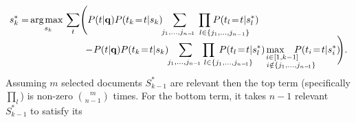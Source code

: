 \begin{align}
s_k^* =  & \, \argmax_{s_k} \sum_t \Biggl( P(t|\vec{q}) P(t_k\!=\!t|s_k)  \sum_{\hspace{-1mm} j_1, \dots, j_{n-\!1}} \hspace{-13.5mm} \prod_{\hspace{14.5mm} l \in \{j_1, \dots, j_{n-1}\}} \hspace{-14mm} P(t_l\!=\!t|s_l^*) \nonumber \\[-2mm]
  & \hspace{20mm} - \!P(t|\vec{q}) P(t_k\!=\!t|s_k) \sum_{\hspace{-1mm} j_1, \dots, j_{n-\!1}} \hspace{-14mm} \prod_{\hspace{14.5mm} l \in \{j_1, \dots, j_{n-\!1}\}} \hspace{-13mm} P(t_l\!=\!t|s_l^*) \hspace{-11.5mm} \max_{\substack{\hspace{5mm} i \in [1,k-1] \\ \hspace{11.5mm} i \notin \{j_1, \dots, j_{n-\!1}\}}} \hspace{-8.5mm} P(t_i\!=\!t|s_i^*) \!\!\Biggr) . \nonumber %
\end{align}
Assuming $m$ selected documents $S_{k-1}^*$ are relevant 
then the top term
(specifically $\prod_l$) is non-zero $\binom{m}{n-1}$ times.  For the
bottom term, it takes $n-1$ relevant $S_{k-1}^*$ to satisfy its
